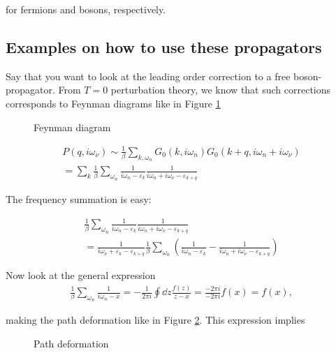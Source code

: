 for fermions and bosons, respectively. 

\subsection[Usage of propagators]{Examples on how to use these propagators}

Say that you want to look at the leading order correction to a free boson-propagator. From $T = 0$ perturbation theory, we know that such corrections corresponds to Feynman diagrams like in Figure \ref{fig:feyn_diag} \\ 


\begin{figure}
	\centering
	
	\caption{Feynman diagram}
	\label{fig:feyn_diag}
\end{figure}


\begin{align*}
    P(q, i\omega_\nu) \sim \frac{1}{\beta}\sum_{k, \omega_n}G_0(k, i\omega_n)G_0(k+q, i\omega_n + i\omega_\nu) \\ = \sum_{k} \frac{1}{\beta} \sum_{\omega_n} \frac{1}{i\omega_n - \varepsilon_k}\frac{1}{i\omega_n + i\omega_\nu - \varepsilon_{k+q}}
\end{align*}

The frequency summation is easy: 

\begin{align*}
    \frac{1}{\beta} \sum_{\omega_n} \frac{1}{i\omega_n - \varepsilon_k}\frac{1}{i\omega_n + i\omega_\nu - \varepsilon_{k+q}} \\ = \frac{1}{i\omega_\nu + \varepsilon_k - \varepsilon_{k+q}} \frac{1}{\beta}\sum_{\omega_n}\left(\frac{1}{i\omega_n - \varepsilon_k} - \frac{1}{i\omega_n + i\omega_\nu - \varepsilon_{k+q}} \right)
\end{align*}


Now look at the general expression
\begin{align*}
    \frac{1}{\beta}\sum_{\omega_n} \frac{1}{i\omega_n - x} = -\frac{1}{2\pi i}\oint \dd z \frac{f(z)}{z - x} = \frac{-2\pi i}{-2\pi i} f(x) = f(x),
\end{align*}

making the path deformation like in Figure \ref{fig:poles}. This expression implies

\begin{figure}
	\centering
	
	\caption{Path deformation}
	\label{fig:poles}
\end{figure}


